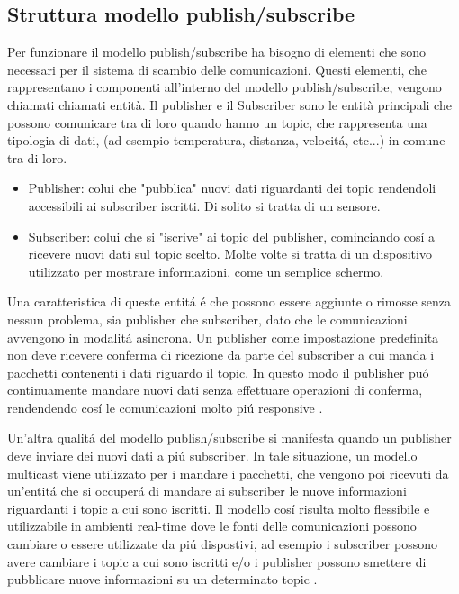 \subsection{Struttura modello publish/subscribe}
Per funzionare il modello publish/subscribe ha bisogno di
elementi che sono necessari per il sistema di scambio delle 
comunicazioni. 
Questi elementi, che rappresentano i componenti all'interno
del modello publish/subscribe, vengono chiamati chiamati entità.
Il publisher e il Subscriber sono le entità principali
che possono comunicare tra di loro quando hanno un topic, che
rappresenta una tipologia di dati, (ad esempio temperatura, 
distanza, velocitá, etc...) in comune tra di loro.
\begin{itemize}
    \item Publisher: colui che "pubblica" nuovi dati riguardanti dei
    topic rendendoli accessibili ai subscriber iscritti. 
    Di solito si tratta di un sensore.
    \item Subscriber: colui che si "iscrive" ai topic del publisher, 
    cominciando
    cosí a ricevere nuovi dati sul topic scelto. Molte volte si tratta
    di un dispositivo utilizzato per mostrare informazioni, come un
    semplice schermo.
\end{itemize}
Una caratteristica di queste entitá é che possono essere aggiunte o rimosse
senza nessun problema, sia publisher che subscriber, dato che le 
comunicazioni avvengono in modalitá asincrona. Un publisher come impostazione
predefinita non deve ricevere conferma di ricezione da parte del 
subscriber a cui manda i pacchetti contenenti i dati riguardo il topic.
In questo modo il publisher puó continuamente mandare nuovi dati
senza effettuare operazioni di conferma, rendendendo cosí le comunicazioni
molto piú responsive \cite{dds1.4}. 

Un'altra qualitá del modello
publish/subscribe si manifesta quando
un publisher deve inviare dei nuovi dati a piú subscriber. 
In tale situazione, un
modello multicast viene utilizzato per i mandare i pacchetti, che vengono 
poi ricevuti da un'entitá che si occuperá di mandare ai subscriber
le nuove informazioni riguardanti i topic a cui sono iscritti.
Il modello cosí risulta molto
flessibile e utilizzabile in ambienti real-time dove le fonti delle
comunicazioni possono cambiare o essere utilizzate da piú dispostivi,
ad esempio i subscriber possono avere cambiare i topic a cui 
sono iscritti e/o i publisher possono smettere di pubblicare nuove
informazioni su un determinato topic \cite{OH2010318}.

